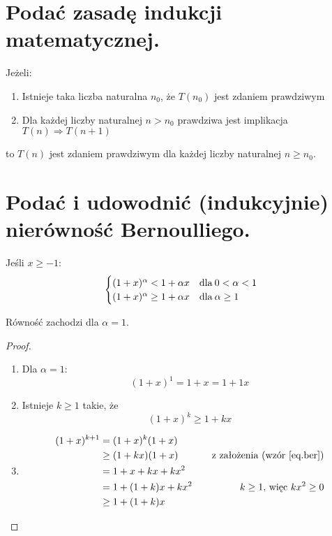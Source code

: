\documentclass{article}
\numberwithin{equation}{section}
\theoremstyle{definition}
\theoremstyle{case}
\let\implies\Rightarrow
\begin{document}
\section{Podać zasadę indukcji matematycznej.}
Jeżeli:
\begin{enumerate}
	\item Istnieje taka liczba naturalna $n_0$, że $T(n_0)$ jest zdaniem prawdziwym
	\item Dla każdej liczby naturalnej $n>n_0$ prawdziwa jest implikacja $T(n) \implies T(n+1)$
\end{enumerate}
to $T(n)$ jest zdaniem prawdziwym dla każdej liczby naturalnej $n \geq n_0$.

\section{Podać i udowodnić (indukcyjnie) nierówność Bernoulliego.}
\begin{multicols}{2}
	Jeśli $x \geq -1$:
	\begin{equation*}
		\begin{cases}
			(1+x)^\alpha < 1 + \alpha x & \textnormal{dla\:} 0 < \alpha < 1
			\\ (1+x)^\alpha \geq 1 + \alpha x & \textnormal{dla\:} \alpha \geq 1
		\end{cases}
	\end{equation*}
	\vspace*{\fill}

	Równość zachodzi dla $\alpha = 1$.
\end{multicols}
\begin{proof}
	\begin{enumerate}
		\item
			Dla $\alpha = 1$:
			\begin{equation*}
				(1+x)^1 = 1+x = 1 + 1x
			\end{equation*}
		\item
			Istnieje $k \geq 1$ takie, że
			\begin{equation}
				\label{eq.ber}
				(1+x)^k \geq 1 + kx
			\end{equation}
		\item
			\begin{align*}
				(1+x)^{k+1}
				   &= (1+x)^k (1+x)
				\\ &\geq (1+kx)(1+x) &\textnormal{\quad z założenia (wzór \ref{eq.ber})}
				\\ &= 1+x+kx+kx^2
				\\ &= 1+(1+k)x+kx^2 &\textnormal{\quad $k\geq 1$, więc $kx^2\geq 0$}
				\\ &\geq 1+(1+k)x
			\end{align*}
	\end{enumerate}
\end{proof}
\end{document}

